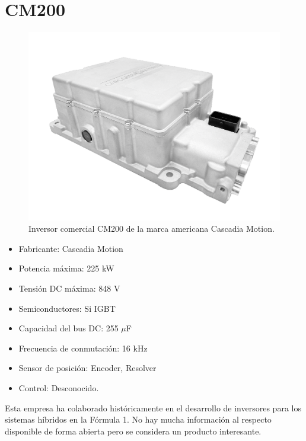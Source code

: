 \section{CM200}
\begin{figure}[H]
	\centering
	\includegraphics[width=0.7\linewidth]{fig/cascadia}
	\caption{Inversor comercial CM200 de la marca americana Cascadia Motion.}
	\label{fig:cascadia}
\end{figure}

\begin{itemize}
	\item Fabricante: Cascadia Motion
	\item Potencia máxima: 225 kW
	\item Tensión DC máxima: 848 V
	\item Semiconductores: Si IGBT
	\item Capacidad del bus DC: 255 $\mu$F
	\item Frecuencia de conmutación: 16 kHz
	\item Sensor de posición: Encoder, Resolver
	\item Control: Desconocido.
\end{itemize}

Esta empresa ha colaborado históricamente en el desarrollo de inversores para los sistemas híbridos en la Fórmula 1. No hay mucha información al respecto disponible de forma abierta pero se considera un producto interesante.
